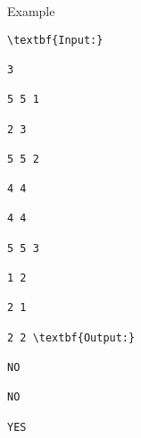 Example
\begin{verbatim}
\textbf{Input:}

3 

5 5 1 

2 3 

5 5 2 

4 4 

4 4 

5 5 3 

1 2 

2 1 

2 2 \textbf{Output:}

NO 

NO 

YES \end{verbatim}